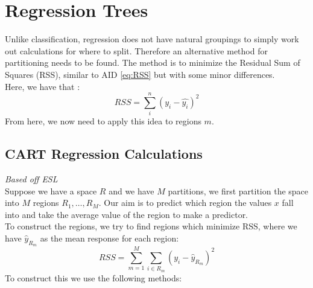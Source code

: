 \documentclass[11pt,a4paper]{report}
\begin{document}
\section{Regression Trees}
Unlike classification, regression does not have natural groupings to simply work out calculations for where to split. 
Therefore an alternative method for partitioning needs to be found.
The method is to minimize the Residual Sum of Squares (RSS), similar to AID \ref{eq:RSS} but with some minor differences. \medskip\\
Here, we have that \cite[Section 3, p. 44-46]{ESL}:
\begin{equation}
  RSS = \sum_{i}^{n}(y_i -\hat{y_i})^2  
\end{equation}
From here, we now need to apply this idea to regions $m$.

\subsection{CART Regression Calculations}
\emph{Based off ESL \cite[Section 9, p. 307]{ESL}}\\
Suppose we have a space $R$ and we have $M$ partitions, we first partition the space into $M$ regions $R_1, \dots, R_M$.
Our aim is to predict which region the values $x$ fall into and take the average value of the region to make a predictor.\\
To construct the regions, we try to find regions which minimize RSS, where we have $\hat{y}_{R_m}$ as the mean response for each region:
\begin{equation}
    RSS = \sum_{m=1}^{M} \sum_{i \in R_m} (y_i - \hat{y}_{R_m})^2
\end{equation}
To construct this we use the following methods:
\end{document}
